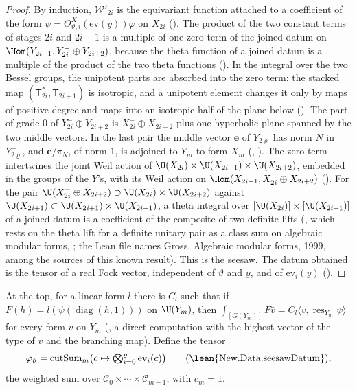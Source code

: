 \begin{proof}
By induction, $\mathcal W'_{2i}$ is the equivariant function attached to a coefficient of the form
$\psi=\Theta^X_{\vartheta,i}(\mathrm{ev}(y))\varphi$ on $X_{2i}$
(). The product of the two constant terms of
stages $2i$ and $2i+1$ is a multiple of one zero term of the joined datum on
$\Hom(Y_{2i+1},Y_{2i}^-\oplus Y_{2i+2})$, because the theta function of a joined datum is a
multiple of the product of the two theta functions
(). In the integral over the two Bessel groups, the unipotent parts are absorbed into the zero term: the
stacked map $(\mathsf T_{2i}^*,\mathsf T_{2i+1})$ is isotropic, and a unipotent element changes it only by maps of
positive degree and maps into an isotropic half of the plane below
(). The part of grade $0$ of $Y_{2i}^-\oplus Y_{2i+2}$ is
$X_{2i}^-\oplus X_{2i+2}$ plus one hyperbolic plane spanned by the two middle vectors. In the last
pair the middle vector $\mathbf e$ of $Y_{2\varrho}$ has norm $N$ in $Y_{2\varrho}^-$, and $\mathbf e/\pi_N$, of norm $1$, is
adjoined to $Y_m$ to form $X_m$ (,
). The zero term intertwines the joint Weil action of
$\U(X_{2i})\times\U(X_{2i+1})\times\U(X_{2i+2})$, embedded in the groups of the $Y$'s, with its Weil
action on $\Hom(X_{2i+1},X_{2i}^-\oplus X_{2i+2})$
(). For the pair
$\U(X_{2i}^-\oplus X_{2i+2})\supset\U(X_{2i})\times\U(X_{2i+2})$ against
$\U(X_{2i+1})\subset\U(X_{2i+1})\times\U(X_{2i+1})$, a theta integral over $[\U(X_{2i})]\times[\U(X_{2i+1})]$ of
a joined datum is a coefficient of the composite of two definite lifts
(, which rests on the theta lift for a definite
unitary pair as a class sum on algebraic modular forms, ; the Lean
file names Gross, Algebraic modular forms, 1999, among the sources of this known result). This is the
seesaw. The datum
obtained is the tensor of a real Fock vector, independent of $\vartheta$ and $y$, and of
$\mathrm{ev}_i(y)$ ().
\end{proof}

At the top, for a linear form $l$ there is $C_l$ such that if $F(h)=l(\psi(\operatorname{diag}(h,1)))$
on $\U(Y_m)$, then $\int_{[G(Y_m)]}F\bar v=C_l\langle v,\operatorname{res}_{Y_m}\psi\rangle$ for every
form $v$ on $Y_m$ (, a direct computation
with the highest vector of the type of $v$ and the branching map). Define the tensor
\[
  \varphi_\vartheta=\operatorname{cutSum}_m\bigl(c\mapsto\textstyle\bigotimes_{i=0}^{\varrho}\mathrm{ev}_i(c)\bigr)
  \qquad(\text{\lean{New.Data.seesawDatum}}),
\]
the weighted sum over $\mathcal C_0\times\cdots\times\mathcal C_{m-1}$, with $c_m=1$.

